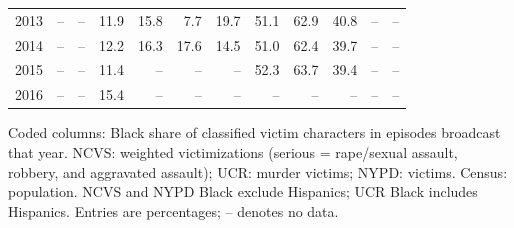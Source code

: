 \begin{center}
\begin{tabular}{@{}rrrrrrrrrrrr@{}}
2013 & -- & -- & 11.9 & 15.8 & 7.7 & 19.7 & 51.1 & 62.9 & 40.8 & -- & -- \\
2014 & -- & -- & 12.2 & 16.3 & 17.6 & 14.5 & 51.0 & 62.4 & 39.7 & -- & -- \\
2015 & -- & -- & 11.4 & -- & -- & -- & 52.3 & 63.7 & 39.4 & -- & -- \\
2016 & -- & -- & 15.4 & -- & -- & -- & -- & -- & -- & -- & -- \\
\bottomrule
\end{tabular}
\par\smallskip
\parbox{\linewidth}{\footnotesize\raggedright Coded columns: Black share of classified victim characters in episodes broadcast that year. NCVS: weighted victimizations (serious = rape/sexual assault, robbery, and aggravated assault); UCR: murder victims; NYPD: victims. Census: population. NCVS and NYPD Black exclude Hispanics; UCR Black includes Hispanics. Entries are percentages; -- denotes no data.}
\end{center}
